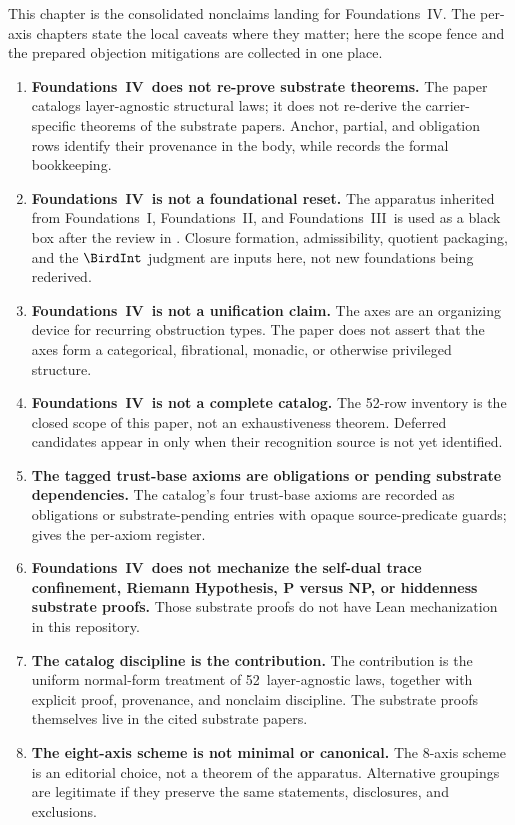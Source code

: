 \documentclass[11pt]{article}
\newcommand{\FIV}{Foundations~IV}
\newcommand{\FoundI}{Foundations~I}
\newcommand{\FoundII}{Foundations~II}
\newcommand{\FoundIII}{Foundations~III}
\newcommand{\NumLaws}{52}
\theoremstyle{definition}
\begin{document}
This chapter is the consolidated nonclaims landing for \FIV. The
per-axis chapters state the local caveats where they matter; here the
scope fence and the prepared objection mitigations are collected in one
place.

\begin{enumerate}[label=\textbf{N\arabic*.}, leftmargin=*]
\item \textbf{\FIV\ does not re-prove substrate theorems.}
The paper catalogs layer-agnostic structural laws; it does not re-derive
the carrier-specific theorems of the substrate papers. Anchor, partial,
and obligation rows identify their provenance in the body, while
 records the formal bookkeeping.

\item \textbf{\FIV\ is not a foundational reset.}
The apparatus inherited from \FoundI, \FoundII, and \FoundIII\ is used
as a black box after the review in . Closure
formation, admissibility, quotient packaging, and the \(\BirdInt\)
judgment are inputs here, not new foundations being rederived.

\item \textbf{\FIV\ is not a unification claim.}
The axes are an organizing device for recurring obstruction types. The
paper does not assert that the axes form a categorical, fibrational,
monadic, or otherwise privileged structure.

\item \textbf{\FIV\ is not a complete catalog.}
The \NumLaws-row inventory is the closed scope of this paper, not an
exhaustiveness theorem. Deferred candidates appear in
 only when their recognition source is not yet
identified.

\item \textbf{The tagged trust-base axioms are obligations or
pending substrate dependencies.}
The catalog's four trust-base axioms are recorded as obligations or
substrate-pending entries with opaque source-predicate guards;
 gives the per-axiom register.

\item \textbf{\FIV\ does not mechanize the self-dual trace
confinement, Riemann Hypothesis, P versus NP, or hiddenness
substrate proofs.}
Those substrate proofs \citep{Tsiokos2026SDTC, Tsiokos2026RH,
Tsiokos2026PvNP, Tsiokos2026CSL} do not have Lean mechanization in
this repository.

\item \textbf{The catalog discipline is the contribution.}
The contribution is the uniform normal-form treatment of \NumLaws\
layer-agnostic laws, together with explicit proof, provenance, and
nonclaim discipline. The substrate proofs themselves live in the
cited substrate papers.

\item \textbf{The eight-axis scheme is not minimal or canonical.}
The 8-axis scheme is an editorial choice, not a theorem of the
apparatus. Alternative groupings are legitimate if they preserve the
same statements, disclosures, and exclusions.
\end{enumerate}
\end{document}
